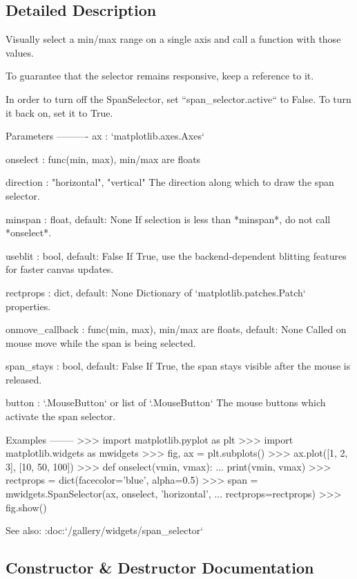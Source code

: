 \subsection{Detailed Description}
\begin{DoxyVerb}Visually select a min/max range on a single axis and call a function with
those values.

To guarantee that the selector remains responsive, keep a reference to it.

In order to turn off the SpanSelector, set ``span_selector.active`` to
False.  To turn it back on, set it to True.

Parameters
----------
ax : `matplotlib.axes.Axes`

onselect : func(min, max), min/max are floats

direction : {"horizontal", "vertical"}
    The direction along which to draw the span selector.

minspan : float, default: None
    If selection is less than *minspan*, do not call *onselect*.

useblit : bool, default: False
    If True, use the backend-dependent blitting features for faster
    canvas updates.

rectprops : dict, default: None
    Dictionary of `matplotlib.patches.Patch` properties.

onmove_callback : func(min, max), min/max are floats, default: None
    Called on mouse move while the span is being selected.

span_stays : bool, default: False
    If True, the span stays visible after the mouse is released.

button : `.MouseButton` or list of `.MouseButton`
    The mouse buttons which activate the span selector.

Examples
--------
>>> import matplotlib.pyplot as plt
>>> import matplotlib.widgets as mwidgets
>>> fig, ax = plt.subplots()
>>> ax.plot([1, 2, 3], [10, 50, 100])
>>> def onselect(vmin, vmax):
...     print(vmin, vmax)
>>> rectprops = dict(facecolor='blue', alpha=0.5)
>>> span = mwidgets.SpanSelector(ax, onselect, 'horizontal',
...                              rectprops=rectprops)
>>> fig.show()

See also: :doc:`/gallery/widgets/span_selector`
\end{DoxyVerb}
 

\subsection{Constructor \& Destructor Documentation}
\mbox{\label{classmatplotlib_1_1widgets_1_1SpanSelector_ab22b5bf4635f88e6648794d393b3c4e0}} 
